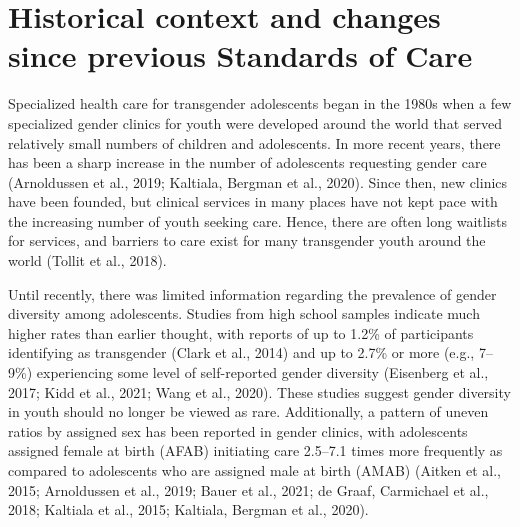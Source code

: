 \documentclass[
]{book}
\begin{document}
\hypertarget{historical-context-and-changes-since-previous-standards-of-care}{%
\section*{Historical context and changes since previous Standards of Care}\label{historical-context-and-changes-since-previous-standards-of-care}}

Specialized health care for transgender adolescents began in the 1980s when a few specialized
gender clinics for youth were developed around
the world that served relatively small numbers
of children and adolescents. In more recent years,
there has been a sharp increase in the number
of adolescents requesting gender care (Arnoldussen
et al., 2019; Kaltiala, Bergman et al., 2020). Since
then, new clinics have been founded, but clinical
services in many places have not kept pace with
the increasing number of youth seeking care.
Hence, there are often long waitlists for services,
and barriers to care exist for many transgender
youth around the world (Tollit et al., 2018).

Until recently, there was limited information
regarding the prevalence of gender diversity
among adolescents. Studies from high school
samples indicate much higher rates than earlier
thought, with reports of up to 1.2\% of participants identifying as transgender (Clark et al.,
2014) and up to 2.7\% or more (e.g., 7--9\%) experiencing some level of self-reported gender diversity (Eisenberg et al., 2017; Kidd et al., 2021;
Wang et al., 2020). These studies suggest gender
diversity in youth should no longer be viewed as
rare. Additionally, a pattern of uneven ratios by
assigned sex has been reported in gender clinics,
with adolescents assigned female at birth (AFAB)
initiating care 2.5--7.1 times more frequently as
compared to adolescents who are assigned male
at birth (AMAB) (Aitken et al., 2015; Arnoldussen
et al., 2019; Bauer et al., 2021; de Graaf,
Carmichael et al., 2018; Kaltiala et al., 2015;
Kaltiala, Bergman et al., 2020).
\end{document}
